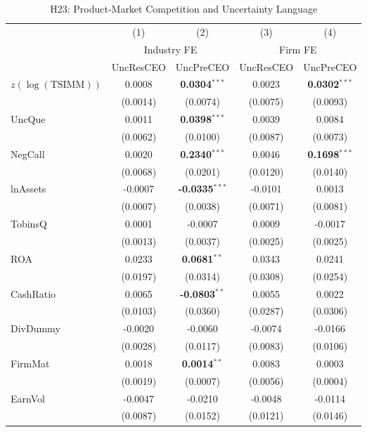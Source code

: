 \begin{landscape}
\begin{table}[H]
\setlength{\tabcolsep}{3pt}
\renewcommand{\arraystretch}{0.85}
\centering
\caption{H23: Product-Market Competition and Uncertainty Language}
\label{tab:h23_competition_uncertainty}
\scriptsize
\begin{tabular}{lcccc}
\toprule
 & (1) & (2) & (3) & (4) \\
 & \multicolumn{2}{c}{Industry FE} & \multicolumn{2}{c}{Firm FE} \\
\cmidrule(lr){2-3} \cmidrule(lr){4-5}
 & UncResCEO & UncPreCEO & UncResCEO & UncPreCEO \\
\midrule
$z(\log(\mathrm{TSIMM}))$ & 0.0008 & \textbf{0.0304}$^{***}$ & 0.0023 & \textbf{0.0302}$^{***}$ \\
 & (0.0014) & (0.0074) & (0.0075) & (0.0093) \\
\midrule
UncQue & 0.0011 & \textbf{0.0398}$^{***}$ & 0.0039 & 0.0084 \\
 & (0.0062) & (0.0100) & (0.0087) & (0.0073) \\
NegCall & 0.0020 & \textbf{0.2340}$^{***}$ & 0.0046 & \textbf{0.1698}$^{***}$ \\
 & (0.0068) & (0.0201) & (0.0120) & (0.0140) \\
lnAssets & -0.0007 & \textbf{-0.0335}$^{***}$ & -0.0101 & 0.0013 \\
 & (0.0007) & (0.0038) & (0.0071) & (0.0081) \\
TobinsQ & 0.0001 & -0.0007 & 0.0009 & -0.0017 \\
 & (0.0013) & (0.0037) & (0.0025) & (0.0025) \\
ROA & 0.0233 & \textbf{0.0681}$^{**}$ & 0.0343 & 0.0241 \\
 & (0.0197) & (0.0314) & (0.0308) & (0.0254) \\
CashRatio & 0.0065 & \textbf{-0.0803}$^{**}$ & 0.0055 & 0.0022 \\
 & (0.0103) & (0.0360) & (0.0287) & (0.0306) \\
DivDummy & -0.0020 & -0.0060 & -0.0074 & -0.0166 \\
 & (0.0028) & (0.0117) & (0.0083) & (0.0106) \\
FirmMat & 0.0018 & \textbf{0.0014}$^{**}$ & 0.0083 & 0.0003 \\
 & (0.0019) & (0.0007) & (0.0056) & (0.0004) \\
EarnVol & -0.0047 & -0.0210 & -0.0048 & -0.0114 \\
 & (0.0087) & (0.0152) & (0.0121) & (0.0146) \\

\end{tabular}
\end{table}
\end{landscape}
